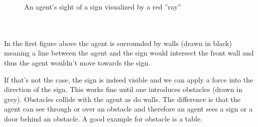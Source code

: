 \documentclass[11pt]{article}
\begin{document}
\begin{itemize}
\begin{minipage}{.3\textwidth}
\begin{figure}[H]
		An agent's sight of a sign visualized by a red ''ray''
	\end{figure}
	\end{minipage}
    \\\\
	  In the first figure above the agent is surrounded by walls (drawn in black) meaning a line between the agent and the sign would intersect the front wall and thus the agent wouldn't move towards the sign.
    
    If that's not the case, the sign is indeed visible and we can apply a force into the direction of the sign. This works fine until one introduces obstacles (drawn in grey). Obstacles collide with the agent as do walls. The difference is that the agent can see through or over an obstacle and therefore an agent sees a sign or a door behind an obstacle. A good example for obstacle is a table.
	

\end{itemize}
\end{document}
